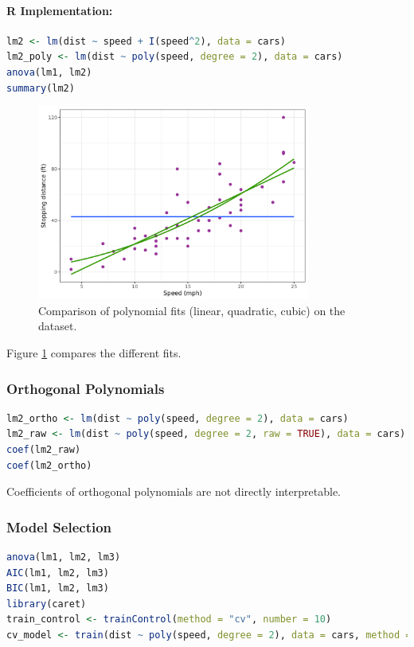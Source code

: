 \documentclass[11pt,a4paper]{article}
\begin{document}
\paragraph{R Implementation:}
\begin{lstlisting}[language=R]
lm2 <- lm(dist ~ speed + I(speed^2), data = cars)
lm2_poly <- lm(dist ~ poly(speed, degree = 2), data = cars)
anova(lm1, lm2)
summary(lm2)
\end{lstlisting}

\begin{figure}[htb]
    \centering
    \includegraphics[width=0.8\textwidth]{polynomial-fits.png}
    \caption{Comparison of polynomial fits (linear, quadratic, cubic) on the dataset.}
    \label{fig:polynomial-fits}
\end{figure}

Figure \ref{fig:polynomial-fits} compares the different fits.

\subsubsection{Orthogonal Polynomials}
\begin{lstlisting}[language=R]
lm2_ortho <- lm(dist ~ poly(speed, degree = 2), data = cars)
lm2_raw <- lm(dist ~ poly(speed, degree = 2, raw = TRUE), data = cars)
coef(lm2_raw)
coef(lm2_ortho)
\end{lstlisting}

\begin{warningbox}
Coefficients of orthogonal polynomials are not directly interpretable.
\end{warningbox}

\subsubsection{Model Selection}
\begin{lstlisting}[language=R]
anova(lm1, lm2, lm3)
AIC(lm1, lm2, lm3)
BIC(lm1, lm2, lm3)
library(caret)
train_control <- trainControl(method = "cv", number = 10)
cv_model <- train(dist ~ poly(speed, degree = 2), data = cars, method = "lm", trControl = train_control)
\end{lstlisting}
\end{document}
